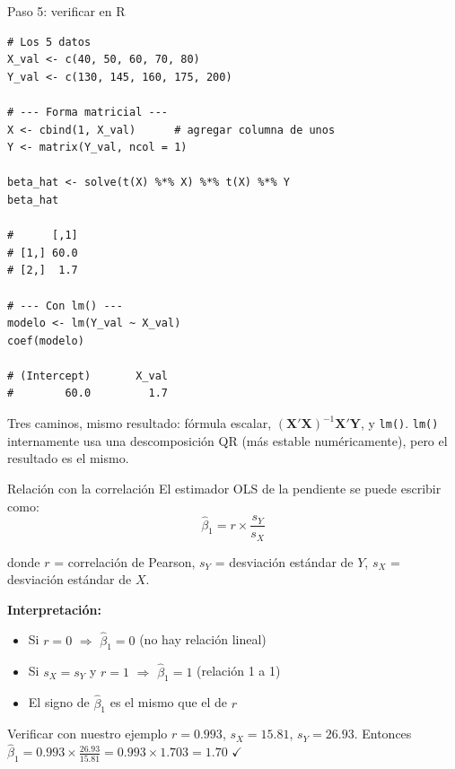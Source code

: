 \documentclass[aspectratio=169, 11pt]{beamer}
\begin{document}
\begin{frame}[fragile]{Paso 5: verificar en R}
\begin{lstlisting}[basicstyle=\ttfamily\scriptsize]
# Los 5 datos
X_val <- c(40, 50, 60, 70, 80)
Y_val <- c(130, 145, 160, 175, 200)

# --- Forma matricial ---
X <- cbind(1, X_val)      # agregar columna de unos
Y <- matrix(Y_val, ncol = 1)

beta_hat <- solve(t(X) %*% X) %*% t(X) %*% Y
beta_hat

#      [,1]
# [1,] 60.0
# [2,]  1.7

# --- Con lm() ---
modelo <- lm(Y_val ~ X_val)
coef(modelo)

# (Intercept)       X_val
#        60.0         1.7
\end{lstlisting}

\begin{block}{}
\small Tres caminos, mismo resultado: fórmula escalar, $(\mathbf{X}'\mathbf{X})^{-1}\mathbf{X}'\mathbf{Y}$, y \texttt{lm()}. \texttt{lm()} internamente usa una descomposición QR (más estable numéricamente), pero el resultado es el mismo.
\end{block}
\end{frame}


\begin{frame}{Relación con la correlación}
El estimador OLS de la pendiente se puede escribir como:
\[
\hat{\beta}_1 = r \times \frac{s_Y}{s_X}
\]
\begin{small}
donde $r$ = correlación de Pearson, $s_Y$ = desviación estándar de $Y$, $s_X$ = desviación estándar de $X$.
\end{small}

\vspace{0.2cm}
\textbf{Interpretación:}
\begin{itemize}
  \item Si $r = 0$ $\Rightarrow$ $\hat{\beta}_1 = 0$ (no hay relación lineal)
  \item Si $s_X = s_Y$ y $r = 1$ $\Rightarrow$ $\hat{\beta}_1 = 1$ (relación 1 a 1)
  \item El signo de $\hat{\beta}_1$ es el mismo que el de $r$
\end{itemize}

\vspace{0.1cm}
\begin{exampleblock}{Verificar con nuestro ejemplo}
\small $r = 0.993$, $s_X = 15.81$, $s_Y = 26.93$. Entonces $\hat{\beta}_1 = 0.993 \times \frac{26.93}{15.81} = 0.993 \times 1.703 = 1.70$ $\checkmark$
\end{exampleblock}
\end{frame}
\end{document}

